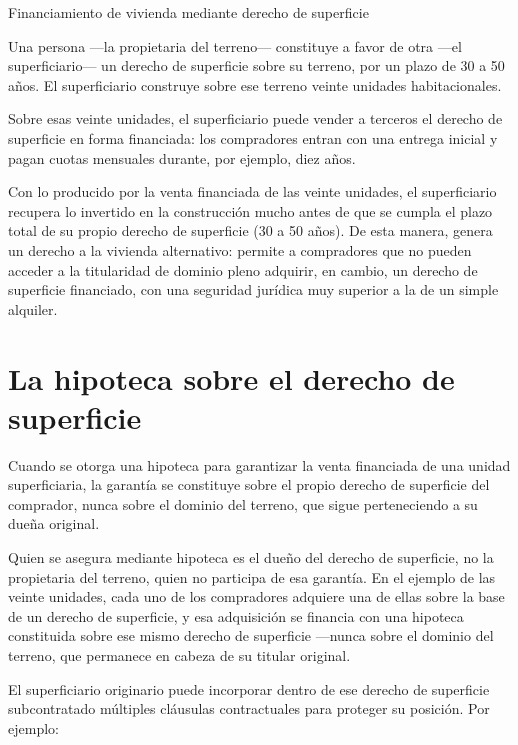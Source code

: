 \documentclass[12pt,oneside]{book}
\begin{document}
\begin{example}{Financiamiento de vivienda mediante derecho de superficie}

Una persona ---la propietaria del terreno--- constituye a favor de otra ---el superficiario--- un derecho de superficie sobre su terreno, por un plazo de 30 a 50 años. El superficiario construye sobre ese terreno veinte unidades habitacionales.

Sobre esas veinte unidades, el superficiario puede vender a terceros el derecho de superficie en forma financiada: los compradores entran con una entrega inicial y pagan cuotas mensuales durante, por ejemplo, diez años.

Con lo producido por la venta financiada de las veinte unidades, el superficiario recupera lo invertido en la construcción mucho antes de que se cumpla el plazo total de su propio derecho de superficie (30 a 50 años). De esta manera, genera un derecho a la vivienda alternativo: permite a compradores que no pueden acceder a la titularidad de dominio pleno adquirir, en cambio, un derecho de superficie financiado, con una seguridad jurídica muy superior a la de un simple alquiler.

\end{example}

\section{La hipoteca sobre el derecho de superficie}

Cuando se otorga una hipoteca para garantizar la venta financiada de una unidad superficiaria, la garantía se constituye sobre el propio derecho de superficie del comprador, nunca sobre el dominio del terreno, que sigue perteneciendo a su dueña original.

\begin{important}
Quien se asegura mediante hipoteca es el dueño del derecho de superficie, no la propietaria del terreno, quien no participa de esa garantía. En el ejemplo de las veinte unidades, cada uno de los compradores adquiere una de ellas sobre la base de un derecho de superficie, y esa adquisición se financia con una hipoteca constituida sobre ese mismo derecho de superficie ---nunca sobre el dominio del terreno, que permanece en cabeza de su titular original.
\end{important}

El superficiario originario puede incorporar dentro de ese derecho de superficie subcontratado múltiples cláusulas contractuales para proteger su posición. Por ejemplo:
\end{document}
